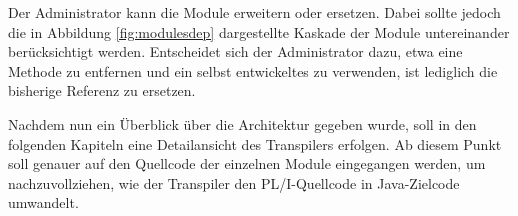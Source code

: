Der Administrator kann die Module erweitern oder ersetzen. Dabei sollte jedoch die in Abbildung \ref{fig:modulesdep} dargestellte Kaskade der Module untereinander berücksichtigt werden. Entscheidet sich der Administrator dazu, etwa eine Methode zu entfernen und ein selbst entwickeltes zu verwenden, ist lediglich die bisherige Referenz zu ersetzen.

Nachdem nun ein Überblick über die Architektur gegeben wurde, soll in den folgenden Kapiteln eine Detailansicht des Transpilers erfolgen. Ab diesem Punkt soll genauer auf den Quellcode der einzelnen Module eingegangen werden, um nachzuvollziehen, wie der Transpiler den PL/I-Quellcode in Java-Zielcode umwandelt.


 \pagebreak


